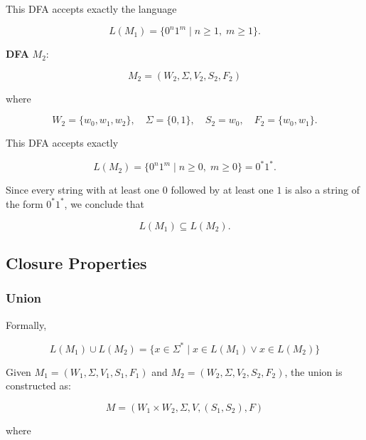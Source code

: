 \documentclass[12pt,a4paper,openany]{article}
\begin{document}
This DFA accepts exactly the language

\[
L(M_1) = \{0^n1^m \mid n \ge 1,\; m \ge 1\}.
\]

\textbf{DFA} $M_2$:

\[
M_2 = (W_2,\Sigma,V_2,S_2,F_2)
\]

where

\[
W_2 = \{w_0,w_1,w_2\},\quad
\Sigma = \{0,1\},\quad
S_2 = w_0,\quad
F_2 = \{w_0,w_1\}.
\]

\begin{center}
\end{center}

This DFA accepts exactly

\[
L(M_2) = \{0^n1^m \mid n \ge 0,\; m \ge 0\} = 0^*1^*.
\]


Since every string with at least one $0$ followed by at least one $1$
is also a string of the form $0^*1^*$, we conclude that

\[
L(M_1) \subseteq L(M_2).
\]



\subsection{Closure Properties}

\subsubsection{Union}

Formally, 

\[L(M_1) \cup L(M_2) = \{x \in \Sigma^* \mid x \in L(M_1) \lor x \in L(M_2)\}\]

Given $M_1 = (W_1, \Sigma, V_1, S_1, F_1)$ and $M_2 = (W_2, \Sigma, V_2, S_2, F_2)$, the union is constructed as:

\[M = (W_1 \times W_2, \Sigma, V, (S_1, S_2), F)\]

where
\end{document}
